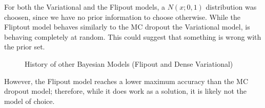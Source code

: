 \documentclass[11pt,twoside]{article}
\numberwithin{Theorem}{section}
\numberwithin{Definition}{section}
\numberwithin{Lemma}{section}
\numberwithin{Algorithm}{section}
\numberwithin{equation}{section}
\begin{document}
For both the Variational and the Flipout models, a $N(x; 0, 1)$ distribution was choosen, since we have no prior information to choose otherwise. While the Fliptout model behaves similarly to the MC dropout the Variational model, is behaving completely at random. This could suggest that something is wrong with the prior set.
\begin{figure}[]
    \centering
    \caption{History of other Bayesian Models (Flipout and Dense Variational)}
    \label{fig:other_histories}
\end{figure}
However, the Flipout model reaches a lower maximum accuracy than the MC dropout model; therefore, while it does work as a solution, it is likely not the model of choice.
\end{document}
